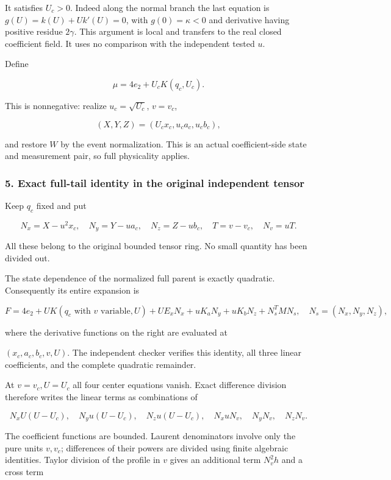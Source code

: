 It satisfies \(U_c>0\). Indeed along the normal branch the last equation
is \(g(U)=k(U)+Uk'(U)=0\), with \(g(0)=\kappa<0\) and derivative having
positive residue \(2\gamma\). This argument is local and transfers to
the real closed coefficient field. It uses no comparison with the
independent tested \(u\).

Define

\[
\mu=4e_2+U_cK(q_c,U_c).
\tag{12}
\]

This is nonnegative: realize \(u_c=\sqrt{U_c}\), \(v=v_c\),

\[
(X,Y,Z)=(U_cx_c,u_ca_c,u_cb_c),
\]

and restore \(W\) by the event normalization. This is an actual
coefficient-side state and measurement pair, so full physicality applies.

\hypertarget{exact-full-tail-identity-in-the-original-independent-tensor}{%
\subsubsection*{5. Exact full-tail identity in the original independent tensor}\label{p4ec1a51262f9:exact-full-tail-identity-in-the-original-independent-tensor}}

Keep \(q_c\) fixed and put

\[
N_x=X-u^2x_c,\quad N_y=Y-ua_c,\quad N_z=Z-ub_c,
\quad T=v-v_c,\quad N_v=uT.
\tag{13}
\]

All these belong to the original bounded tensor ring. No small quantity
has been divided out.

The state dependence of the normalized full parent is exactly quadratic.
Consequently its entire expansion is

\[
F=4e_2+U K(q_c\text{ with }v\text{ variable},U)
+U E_xN_x+uK_aN_y+uK_bN_z+N_s^TMN_s,
\quad N_s=(N_x,N_y,N_z),
\tag{14}
\]

where the derivative functions on the right are evaluated at

\((x_c,a_c,b_c,v,U)\). The independent checker verifies this identity,
all three linear coefficients, and the complete quadratic remainder.

At \(v=v_c,U=U_c\) all four center equations vanish. Exact difference
division therefore writes the linear terms as combinations of

\[
N_x U(U-U_c),\quad N_yu(U-U_c),\quad N_zu(U-U_c),
\quad N_xuN_v,\quad N_yN_v,\quad N_zN_v.
\tag{15}
\]

The coefficient functions are bounded. Laurent denominators involve only
the pure units \(v,v_c\); differences of their powers are divided using
finite algebraic identities. Taylor division of the profile in \(v\)
gives an additional term \(N_v^2h\) and a cross term

